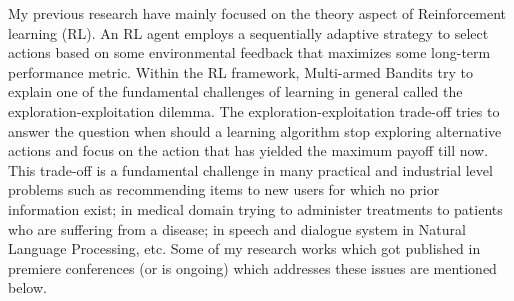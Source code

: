\documentclass[twoside]{article}
\begin{document}
My previous research have mainly focused on the theory aspect of Reinforcement learning (RL). An RL agent employs a sequentially adaptive strategy to select actions based on some environmental feedback that maximizes some long-term performance metric. Within the RL framework, Multi-armed Bandits try to explain one of the fundamental challenges of learning in general called the exploration-exploitation dilemma. The exploration-exploitation trade-off tries to answer the question when should a learning algorithm stop exploring alternative actions and focus on the action that has yielded the maximum payoff till now. This trade-off is a fundamental challenge in many practical and industrial level problems such as recommending items to new users for which no prior information exist; in medical domain trying to administer treatments to patients who are suffering from a disease; in speech and dialogue system in Natural Language Processing, etc. Some of my research works which got published in premiere conferences (or is ongoing) which addresses these issues are  mentioned below.


\end{document}

